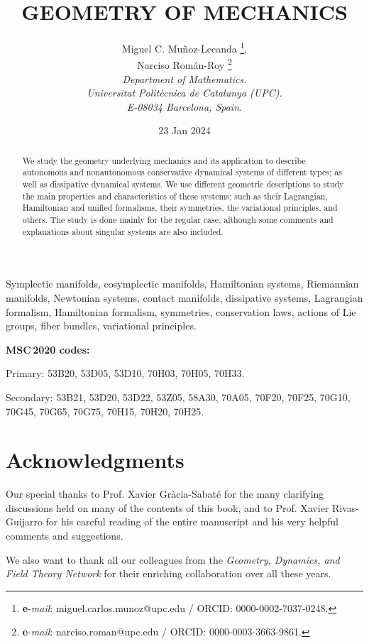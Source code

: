 \documentclass[12pt]{report}
\title{GEOMETRY OF MECHANICS}
\author{\sc Miguel C. Mu\~noz-Lecanda
\thanks{{\bf e}-{\it mail}: miguel.carlos.munoz@upc.edu /
ORCID: 0000-0002-7037-0248.},
   \\
\sc Narciso Rom\'an-Roy
\thanks{{\bf e}-{\it mail}: narciso.roman@upc.edu / 
ORCID: 0000-0003-3663-9861.}
   \\
  {\it Department of Mathematics.}\\
{\it Universitat Polit\`ecnica de Catalunya (UPC).}\\
{\it  E-08034 Barcelona, Spain.}}
\date{23 Jan 2024}
\begin{document}

\maketitle

\begin{abstract}
We study
the geometry underlying mechanics and its application
to describe autonomous and nonautonomous conservative dynamical systems of different types; as well as dissipative dynamical systems.
We use different geometric descriptions to study
the main properties and characteristics of these systems;
such as their Lagrangian, Hamiltonian and unified formalisms, 
their symmetries, the variational principles, and others.
The study is done mainly for the regular case,
although some comments and explanations about singular systems are also included.
\end{abstract}

\bigskip


\noindent
Symplectic manifolds, cosymplectic manifolds, Hamiltonian systems,  Riemannian manifolds, Newtonian systems, contact manifolds, dissipative systems, Lagrangian formalism, Hamiltonian formalism, symmetries, conservation laws,  actions of Lie groups, fiber bundles, variational principles.

\medskip\medskip\medskip\medskip

\noindent\textbf{MSC\,2020 codes:}

\noindent Primary: 53B20, 53D05, 53D10, 70H03, 70H05, 70H33.

\noindent Secondary: 53B21, 53D20, 53D22, 53Z05, 58A30, 70A05, 70F20, 70F25, 70G10, 70G45, 70G65, 70G75, 70H15, 70H20, 70H25.


\setcounter{tocdepth}{2}


\newpage

\section*{Acknowledgments}


Our special thanks to Prof. Xavier Gr\`acia-Sabat\'e for the many clarifying discussions held on many of the contents of this book,
and to Prof. Xavier Rivas-Guijarro for his careful reading of the entire manuscript and his very helpful comments and suggestions.

We also want to thank all our colleagues from the 
{\sl Geometry, Dynamics, and Field Theory Network} for their enriching collaboration over all these years.
\end{document}
